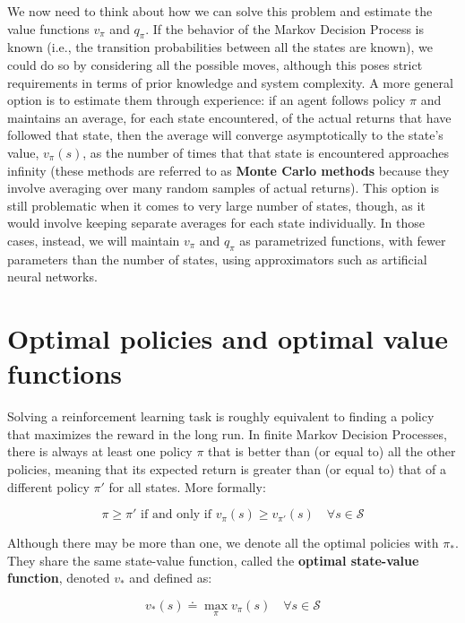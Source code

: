 We now need to think about how we can solve this problem and estimate the value functions $v_\pi$ and $q_\pi$. If the behavior of the Markov Decision Process is known (i.e., the transition probabilities between all the states are known), we could do so by considering all the possible moves, although this poses strict requirements in terms of prior knowledge and system complexity. A more general option is to estimate them through experience: if an agent follows policy $\pi$ and maintains an average, for each state encountered, of the actual returns that have followed that state, then the average will converge asymptotically to the state’s value, $v_\pi(s)$, as the number of times that that state is encountered approaches infinity (these methods are referred to as \textbf{Monte Carlo methods} because they involve averaging over many random samples of actual returns). This option is still problematic when it comes to very large number of states, though, as it would involve keeping separate averages for each state individually. In those cases, instead, we will maintain $v_\pi$ and $q_\pi$ as parametrized functions, with fewer parameters than the number of states, using approximators such as artificial neural networks.

\section{Optimal policies and optimal value functions}
Solving a reinforcement learning task is roughly equivalent to finding a policy that maximizes the reward in the long run. In finite Markov Decision Processes, there is always at least one policy $\pi$ that is better than (or equal to) all the other policies, meaning that its expected return is greater than (or equal to) that of a different policy $\pi'$ for all states. More formally:

\begin{equation*}
    \pi \ge \pi' \text{ if and only if } v_\pi(s) \ge v_{\pi'} (s) \quad \forall s \in \mathcal{S}
\end{equation*}

Although there may be more than one, we denote all the optimal policies with $\pi_*$. They share the same state-value function, called the \textbf{optimal state-value function}, denoted $v_*$ and defined as:

\begin{equation}
    v_*(s) \doteq \max_\pi v_\pi(s) \quad \forall s \in \mathcal{S}
    \label{eq:ch2-optimalstatevaluefunction}
\end{equation}

